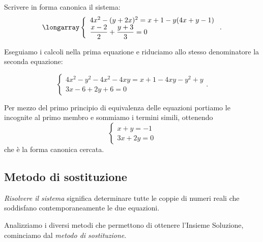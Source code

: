 \begin{exrig}
 \begin{esempio}
 Scrivere in forma canonica il sistema:
\[\longarray\left\{\begin{array}{l}4x^{2}-(y+2x)^{2}=x+1-y(4x+y-1)\\
\dfrac{x-2}{2}+\dfrac{y+3}{3}=0
\end{array}\right..\]

Eseguiamo i calcoli nella prima equazione e riduciamo allo stesso
denominatore la seconda equazione:

\[\left\{\begin{array}{l}
 4x^{2}-y^{2}-4x^{2}-4xy=x+1-4xy-y^{2}+y\\
 3x-6+2y+6=0
 \end{array}\right..\]

Per mezzo del primo principio di equivalenza delle equazioni portiamo le
incognite al primo membro e sommiamo i termini simili, ottenendo
 \[\left\{\begin{array}{l}
   x+y=-1\\
   3x+2y=0
\end{array}\right.\]
che è la forma canonica cercata.
 \end{esempio}
\end{exrig}

\subsection{Metodo di sostituzione}
\emph{Risolvere il sistema} significa determinare tutte le coppie di
numeri reali che soddisfano contemporaneamente le due equazioni.

Analizziamo i diversi metodi che permettono di ottenere
l'Insieme Soluzione, cominciamo dal \emph{metodo di sostituzione}.

